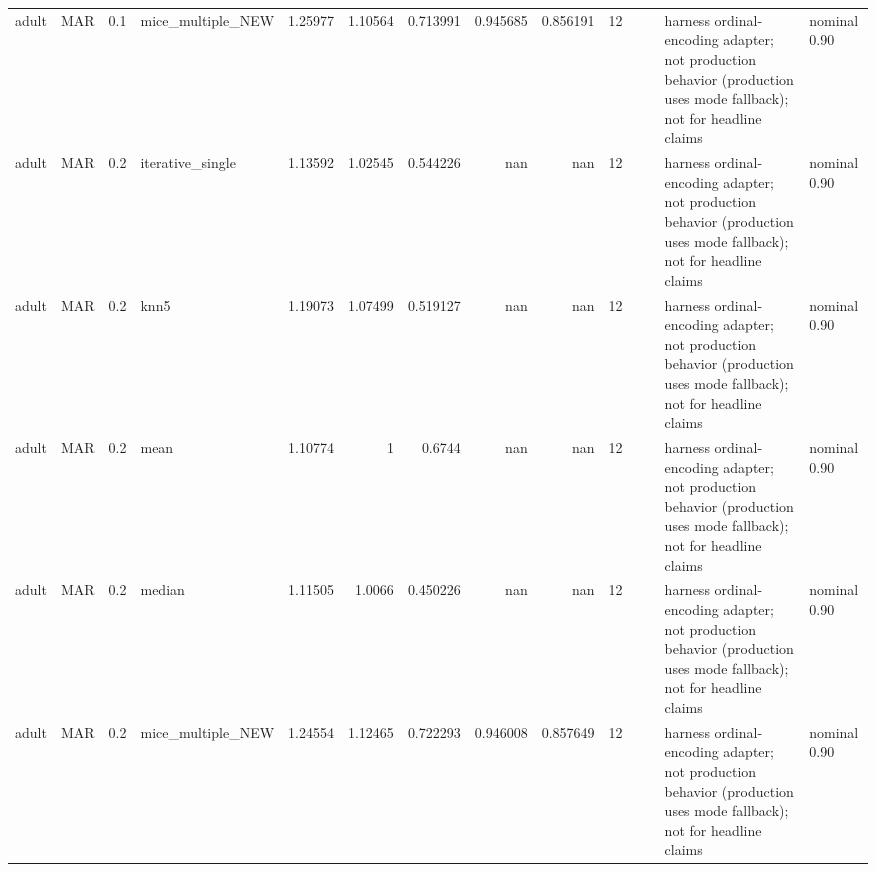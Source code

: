 \begin{table}[ht]
\begin{tabular}{llrlrrrrrrllll}
 adult                & MAR         &         0.1 & mice\_multiple\_NEW &       1.25977  &             1.10564  &                 0.713991 &                       0.945685 &                         0.856191 &        12 &                    &                                         & harness ordinal-encoding adapter; not production behavior (production uses mode fallback); not for headline claims & nominal 0.90              \\
 adult                & MAR         &         0.2 & iterative\_single  &       1.13592  &             1.02545  &                 0.544226 &                     nan        &                       nan        &        12 &                    &                                         & harness ordinal-encoding adapter; not production behavior (production uses mode fallback); not for headline claims & nominal 0.90              \\
 adult                & MAR         &         0.2 & knn5              &       1.19073  &             1.07499  &                 0.519127 &                     nan        &                       nan        &        12 &                    &                                         & harness ordinal-encoding adapter; not production behavior (production uses mode fallback); not for headline claims & nominal 0.90              \\
 adult                & MAR         &         0.2 & mean              &       1.10774  &             1        &                 0.6744   &                     nan        &                       nan        &        12 &                    &                                         & harness ordinal-encoding adapter; not production behavior (production uses mode fallback); not for headline claims & nominal 0.90              \\
 adult                & MAR         &         0.2 & median            &       1.11505  &             1.0066   &                 0.450226 &                     nan        &                       nan        &        12 &                    &                                         & harness ordinal-encoding adapter; not production behavior (production uses mode fallback); not for headline claims & nominal 0.90              \\
 adult                & MAR         &         0.2 & mice\_multiple\_NEW &       1.24554  &             1.12465  &                 0.722293 &                       0.946008 &                         0.857649 &        12 &                    &                                         & harness ordinal-encoding adapter; not production behavior (production uses mode fallback); not for headline claims & nominal 0.90              \\

\end{tabular}
\end{table}
